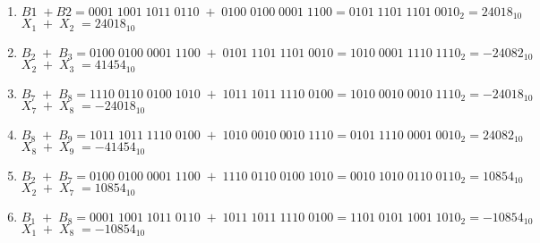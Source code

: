 \documentclass{article}
\begin{document}
\begin{enumerate}
  \item $ B1 \; +  B2 = 0001 \; 1001 \; 1011 \; 0110 \; + \; 0100 \; 0100 \; 0001 \; 1100 = 0101 \; 1101 \; 1101 \; 0010 _{2} = 24018_{10}  $ \\
  $ X_{1} \; + \; X_{2} \; = 24018_{10} $
  \item $ B_{2} \; + \; B_{3} = 0100 \; 0100 \; 0001 \; 1100 \; + \; 0101 \; 1101 \; 1101 \; 0010 = 1010 \; 0001 \; 1110 \; 1110_{2} = -24082_{10}  $ \\
  $ X_{2} \; + \; X_{3} \; = 41454_{10} $
  \item $ B_{7} \; + \; B_{8} = 1110 \; 0110 \; 0100 \; 1010 \; + \; 1011 \; 1011 \; 1110 \; 0100 = 1010 \; 0010 \; 0010 \; 1110_{2} = -24018_{10}  $ \\
  $ X_{7} \; + \; X_{8} \; = -24018_{10} $
  \item $ B_{8} \; + \; B_{9} = 1011 \; 1011 \; 1110 \; 0100 \; + \; 1010 \; 0010 \; 0010 \; 1110 = 0101 \; 1110 \; 0001 \; 0010_{2} = 24082_{10} $ \\
  $ X_{8} \; + \; X_{9} \; = -41454_{10} $
  \item $ B_{2} \; + \; B_{7} = 0100 \; 0100 \; 0001 \; 1100 \; + \; 1110 \; 0110 \; 0100 \; 1010 = 0010 \; 1010 \; 0110 \; 0110_{2} = 10854_{10} $ \\
  $ X_{2} \; + \; X_{7} \; = 10854_{10} $
  \item $ B_{1} \; + \; B_{8} = 0001 \; 1001 \; 1011 \; 0110 \; + \; 1011 \; 1011 \; 1110 \; 0100 = 1101 \; 0101 \; 1001 \; 1010_{2} = -10854_{10} $ \\
  $ X_{1} \; + \; X_{8} \; = -10854_{10} $
\end{enumerate}
\end{document}
